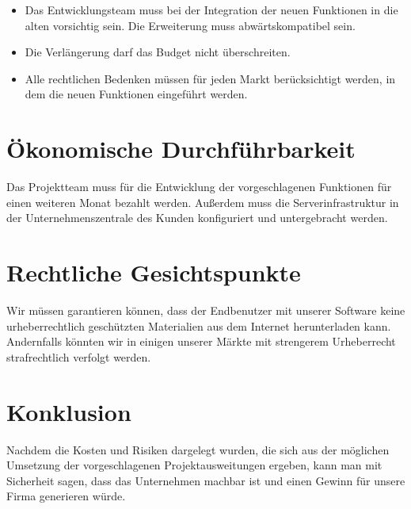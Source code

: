 \documentclass[parskip=full]{scrartcl}
\begin{document}
\begin{itemize}
  \item Das Entwicklungsteam muss bei der Integration der neuen Funktionen in die alten vorsichtig sein. Die Erweiterung muss abwärtskompatibel sein.
  \item Die Verlängerung darf das Budget nicht überschreiten.
 \item Alle rechtlichen Bedenken müssen für jeden Markt berücksichtigt werden, in dem die neuen Funktionen eingeführt werden.
\end{itemize}

\section{Ökonomische Durchführbarkeit}

Das Projektteam muss für die Entwicklung der vorgeschlagenen Funktionen für einen weiteren Monat bezahlt werden. Außerdem muss die Serverinfrastruktur in der Unternehmenszentrale des Kunden konfiguriert und untergebracht werden.

\section{Rechtliche Gesichtspunkte}

Wir müssen garantieren können, dass der Endbenutzer mit unserer Software keine urheberrechtlich geschützten Materialien aus dem Internet herunterladen kann. Andernfalls könnten wir in einigen unserer Märkte mit strengerem Urheberrecht strafrechtlich verfolgt werden.

\section{Konklusion}

Nachdem die Kosten und Risiken dargelegt wurden, die sich aus der möglichen Umsetzung der vorgeschlagenen Projektausweitungen ergeben, kann man mit Sicherheit sagen, dass das Unternehmen machbar ist und einen Gewinn für unsere Firma generieren würde.
\end{document}
